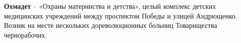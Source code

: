 \medskip

\textbf{Охмадет} – «Охраны материнства и детства», целый комплекс детских медицинских учреждений между проспектом Победы и улицей Андрющенко. Возник на месте нескольких дореволюционных больниц Товарищества чернорабочих.\\


